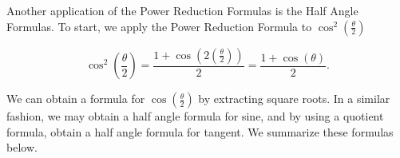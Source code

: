 \medskip

Another application of the Power Reduction Formulas is the Half Angle Formulas. To start, we apply the Power Reduction Formula to $\cos^{2}\left(\frac{\theta}{2}\right)$

\[ \cos^{2}\left(\dfrac{\theta}{2}\right) = \dfrac{1 + \cos\left(2 \left(\frac{\theta}{2}\right)\right)}{2} = \dfrac{1 + \cos(\theta)}{2}.\]

We can obtain a formula for $\cos\left(\frac{\theta}{2}\right)$ by extracting square roots.  In a similar fashion, we may obtain a half angle formula for sine, and by  using a quotient formula, obtain a half angle formula for tangent.  We summarize these formulas below.

\smallskip


\medskip

